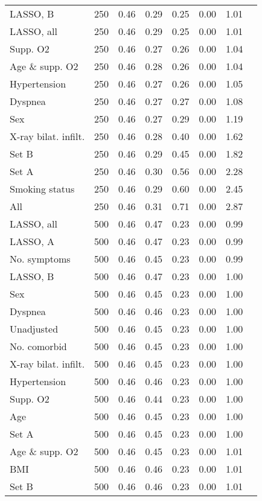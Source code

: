 \documentclass{article}
\begin{document}
{\begin{longtable}{lccccccc}
LASSO, B & 250 & 0.46 & 0.29 & 0.25 & 0.00 & 1.01\\
LASSO, all & 250 & 0.46 & 0.29 & 0.25 & 0.00 & 1.01\\
Supp. O2 & 250 & 0.46 & 0.27 & 0.26 & 0.00 & 1.04\\
Age \& supp. O2 & 250 & 0.46 & 0.28 & 0.26 & 0.00 & 1.04\\
Hypertension & 250 & 0.46 & 0.27 & 0.26 & 0.00 & 1.05\\
Dyspnea & 250 & 0.46 & 0.27 & 0.27 & 0.00 & 1.08\\
Sex & 250 & 0.46 & 0.27 & 0.29 & 0.00 & 1.19\\
X-ray bilat. infilt. & 250 & 0.46 & 0.28 & 0.40 & 0.00 & 1.62\\
Set B & 250 & 0.46 & 0.29 & 0.45 & 0.00 & 1.82\\
Set A & 250 & 0.46 & 0.30 & 0.56 & 0.00 & 2.28\\
Smoking status & 250 & 0.46 & 0.29 & 0.60 & 0.00 & 2.45\\
All & 250 & 0.46 & 0.31 & 0.71 & 0.00 & 2.87\\ \midrule
LASSO, all & 500 & 0.46 & 0.47 & 0.23 & 0.00 & 0.99\\
LASSO, A & 500 & 0.46 & 0.47 & 0.23 & 0.00 & 0.99\\
No. symptoms & 500 & 0.46 & 0.45 & 0.23 & 0.00 & 0.99\\
LASSO, B & 500 & 0.46 & 0.47 & 0.23 & 0.00 & 1.00\\
Sex & 500 & 0.46 & 0.45 & 0.23 & 0.00 & 1.00\\
Dyspnea & 500 & 0.46 & 0.46 & 0.23 & 0.00 & 1.00\\
Unadjusted & 500 & 0.46 & 0.45 & 0.23 & 0.00 & 1.00\\
No. comorbid & 500 & 0.46 & 0.45 & 0.23 & 0.00 & 1.00\\
X-ray bilat. infilt. & 500 & 0.46 & 0.45 & 0.23 & 0.00 & 1.00\\
Hypertension & 500 & 0.46 & 0.46 & 0.23 & 0.00 & 1.00\\
Supp. O2 & 500 & 0.46 & 0.44 & 0.23 & 0.00 & 1.00\\
Age & 500 & 0.46 & 0.45 & 0.23 & 0.00 & 1.00\\
Set A & 500 & 0.46 & 0.45 & 0.23 & 0.00 & 1.00\\
Age \& supp. O2 & 500 & 0.46 & 0.45 & 0.23 & 0.00 & 1.01\\
BMI & 500 & 0.46 & 0.46 & 0.23 & 0.00 & 1.01\\
Set B & 500 & 0.46 & 0.46 & 0.23 & 0.00 & 1.01\\

\end{longtable}}
\end{document}
